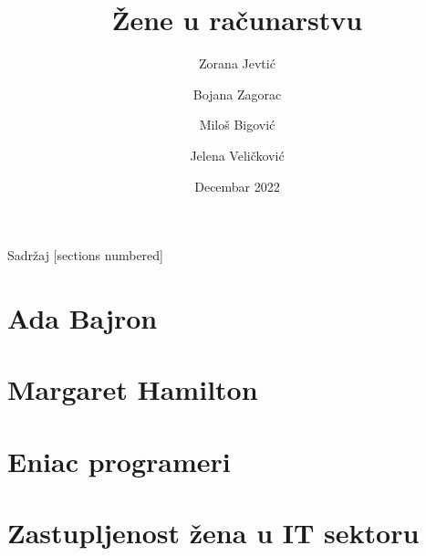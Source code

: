 \documentclass[aspectratio=169]{beamer}
\title{Žene u računarstvu}
\author{ Zorana Jevtić \and Bojana Zagorac\\  \and Miloš Bigović  \and Jelena Veličković\\}
\date{Decembar 2022}
\begin{document}
\titleframe  %


\begin{frame}{Sadržaj}
  [sections numbered]
  \tableofcontents[hideallsubsections]
\end{frame}

\section{Ada Bajron}



\section{Margaret Hamilton}



\section{Eniac programeri}



\section{Zastupljenost žena u IT sektoru}
\end{document}
